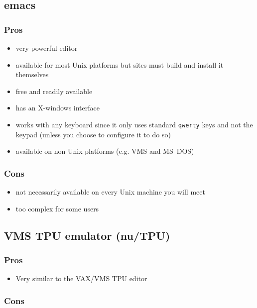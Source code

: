 \documentclass[twoside,11pt,nolof]{starlink}
\begin{document}
\subsection{emacs}

\subsubsection*{Pros}

\begin{itemize}
\item very powerful editor
\item available for most Unix platforms but sites must build and
install it themselves
\item free and readily available
\item has an X-windows interface
\item works with any keyboard since it only uses standard \texttt{qwerty} keys
and not the keypad (unless you choose to configure it to do so)
\item available on non-Unix platforms (e.g. VMS and MS--DOS)
\end{itemize}

\subsubsection*{Cons}
\begin{itemize}
\item not necessarily available on every Unix machine you will meet
\item too complex for some users
\end{itemize}

\subsection{VMS TPU emulator (nu/TPU)}

\subsubsection*{Pros}

\begin{itemize}
\item Very similar to the VAX/VMS TPU editor
\end{itemize}

\subsubsection*{Cons}
\end{document}
